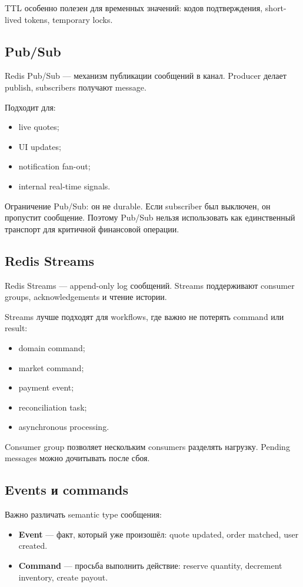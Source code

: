 \documentclass[12pt,a4paper]{article}
\begin{document}
TTL особенно полезен для временных значений: кодов подтверждения, short-lived
tokens, temporary locks.

\subsection{Pub/Sub}

Redis Pub/Sub --- механизм публикации сообщений в канал. Producer делает publish,
subscribers получают message.

Подходит для:
\begin{itemize}
    \item live quotes;
    \item UI updates;
    \item notification fan-out;
    \item internal real-time signals.
\end{itemize}

Ограничение Pub/Sub: он не durable. Если subscriber был выключен, он пропустит
сообщение. Поэтому Pub/Sub нельзя использовать как единственный транспорт для
критичной финансовой операции.

\subsection{Redis Streams}

Redis Streams --- append-only log сообщений. Streams поддерживают consumer groups,
acknowledgements и чтение истории.

Streams лучше подходят для workflows, где важно не потерять command или result:
\begin{itemize}
    \item domain command;
    \item market command;
    \item payment event;
    \item reconciliation task;
    \item asynchronous processing.
\end{itemize}

Consumer group позволяет нескольким consumers разделять нагрузку. Pending messages
можно дочитывать после сбоя.

\subsection{Events и commands}

Важно различать semantic type сообщения:
\begin{itemize}
    \item \textbf{Event} --- факт, который уже произошёл: quote updated, order
          matched, user created.
    \item \textbf{Command} --- просьба выполнить действие: reserve quantity,
          decrement inventory, create payout.
\end{itemize}
\end{document}
